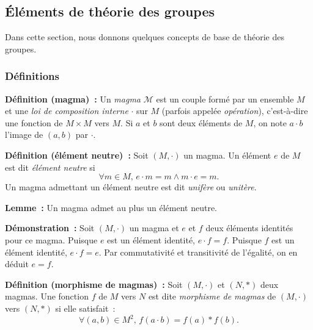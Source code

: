\subsection{Éléments de théorie des groupes}

Dans cette section, nous donnons quelques concepts de base de théorie des groupes. 

\subsubsection{Définitions}

\noindent\textbf{Définition (magma) :} Un \textit{magma} $\mathcal{M}$ est un couple formé par un ensemble $M$ et une \textit{loi de composition interne} $\cdot$ sur $M$ (parfois appelée \textit{opération}), c'est-à-dire une fonction de $M \times M$ vers $M$. 
    Si $a$ et $b$ sont deux éléments de $M$, on note $a \cdot b$ l'image de $(a,b)$ par $\cdot$.

\medskip

\noindent\textbf{Définition (élément neutre) :} Soit $(M,\cdot)$ un magma.
    Un élément $e$ de $M$ est dit \textit{élément neutre} si 
    \begin{equation*}
        \forall m \in M, \, e \cdot m = m \wedge m \cdot e = m.
    \end{equation*}
    Un magma admettant un élément neutre est dit \textit{unifère} ou \textit{unitère}.

\medskip

\noindent\textbf{Lemme :} Un magma admet au plus un élément neutre.

\medskip

\noindent\textbf{Démonstration :} Soit $(M,\cdot)$ un magma et $e$ et $f$ deux éléments identités pour ce magma.
    Puisque $e$ est un élément identité, $e \cdot f = f$.
    Puisque $f$ est un élément identité, $e \cdot f = e$.
    Par commutativité et transitivité de l'égalité, on en déduit $e = f$.

    \hfill \square

\medskip

\noindent\textbf{Définition (morphisme de magmas) :} Soit $\left(M, \cdot \right)$ et $\left(N, \ast \right)$ deux magmas.
    Une fonction $f$ de $M$ vers $N$ est dite \textit{morphisme de magmas} de $\left(M, \cdot \right)$ vers $\left(N, \ast \right)$ si elle satisfait : 
    \begin{equation*}
        \forall (a,b) \in M^2, \, f (a \cdot b) = f(a) \ast f(b) .
    \end{equation*}

